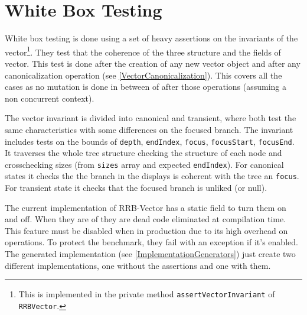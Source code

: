 \section{White Box Testing}
\label{InvariantAssertions}
White box testing is done using a set of heavy assertions on the invariants of the vector\footnote{This is implemented in the private method \texttt{assertVectorInvariant} of \texttt{RRBVector}.}. They test that the coherence of the three structure and the fields of vector. This test is done after the creation of any new vector object and after any canonicalization operation (see \ref{VectorCanonicalization}). This covers all the cases as no mutation is done in between of after those operations (assuming a non concurrent context). 

The vector invariant is divided into canonical and transient, where both test the same characteristics with some differences on the focused branch. The invariant includes tests on the bounds of \texttt{depth}, \texttt{endIndex}, \texttt{focus}, \texttt{focusStart}, \texttt{focusEnd}. It traverses the whole tree structure checking the structure of each node and crosschecking sizes (from \texttt{sizes} array and expected \texttt{endIndex}). For canonical states it checks the the branch in the displays is coherent with the tree an \texttt{focus}. For transient state it checks that the focused branch is unliked (or null). 

The current implementation of RRB-Vector has a static  field to turn them on and off. When they are of they are dead code eliminated at compilation time. This feature must be disabled when in production due to its high overhead on operations. To protect the benchmark, they fail with an exception if it's enabled. The generated implementation (see \ref{ImplementationGenerators}) just create two different implementations, one without the assertions and one with them.


